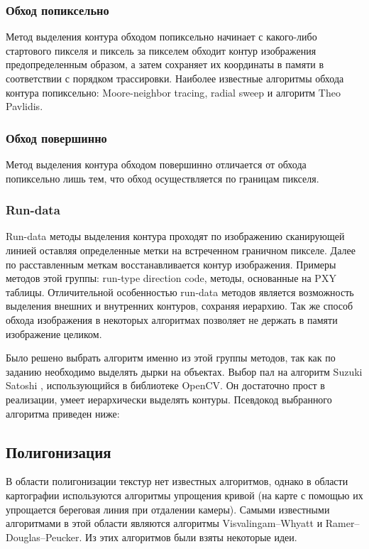 \documentclass{fefu_thesis/cls/fefu}
\begin{document}
    \subsubsection{Обход попиксельно}
    Метод выделения контура обходом попиксельно начинает с какого-либо стартового пикселя и пиксель за пикселем обходит контур изображения предопределенным образом, а затем сохраняет их координаты в памяти в соответствии с порядком трассировки. Наиболее известные алгоритмы обхода контура попиксельно: Moore-neighbor tracing\cite{MoorNeighbor}, radial sweep\cite{RadialSweep} и алгоритм Theo Pavlidis\cite{TheoPavlidis}.
    \subsubsection{Обход повершинно}
    Метод выделения контура обходом повершинно отличается от обхода попиксельно лишь тем, что обход осуществляется по границам пикселя.
    \subsubsection{Run-data}
    Run-data методы выделения контура проходят по изображению сканирующей линией оставляя определенные метки на встреченном граничном пикселе. Далее по расставленным меткам восстанавливается контур изображения. Примеры методов этой группы: run-type direction code, методы, основанные на PXY таблицы. Отличительной особенностью run-data методов является возможность выделения внешних и внутренних контуров, сохраняя иерархию. Так же способ обхода изображения в некоторых алгоритмах позволяет не держать в памяти изображение целиком.

    Было решено выбрать алгоритм именно из этой группы методов, так как по заданию необходимо выделять дырки на объектах. Выбор пал на алгоритм Suzuki Satoshi \cite{SuzukiAlgorithm}, использующийся в библиотеке OpenCV. Он достаточно прост в реализации, умеет иерархически выделять контуры. Псевдокод выбранного алгоритма приведен ниже:
    \subsection{Полигонизация}
    В области полигонизации текстур нет известных алгоритмов, однако в области картографии используются алгоритмы упрощения кривой (на карте с помощью их упрощается береговая линия при отдалении камеры). Самыми известными алгоритмами в этой области являются алгоритмы Visvalingam–Whyatt\cite{VisvalingamWhyatt} и Ramer–Douglas–Peucker\cite{DouglasPeucker}. Из этих алгоритмов были взяты некоторые идеи.
\end{document}
